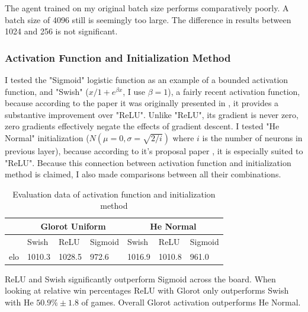 \noindent
The agent trained on my original batch size performs comparatively poorly. A batch size of 4096 still is seemingly too large. The difference in results between 1024 and 256 is not significant.


\subsubsection{Activation Function and Initialization Method}\label{subsubsec:tr:opt_alg:params:batch}
 I tested the "Sigmoid" logistic function as an example of a bounded activation function, and "Swish" ($x/1+e^{\beta x}$, I use $\beta = 1$),  a fairly recent activation function, because according to the paper it was originally presented in \cite{ramachandran2017searching}, it provides a substantive improvement over "ReLU". Unlike "ReLU", its gradient is never zero, zero gradients effectively negate the effects of gradient descent. I tested "He Normal" initialization ($N(\mu = 0, \sigma = \sqrt{2/i})$ where $i$ is the number of neurons in previous layer), because according to it's proposal paper \cite{He_2015_ICCV}, it is especially suited to "ReLU". Because this connection between activation function and initialization method is claimed, I also made comparisons between all their combinations.

\begin{table}[H]
\begin{center}
\begin{tabular}{ |l|p{1.25cm}|p{1.25cm}|p{1.25cm}||p{1.25cm}|p{1.25cm}|p{1.25cm}|  }
 \hline
 & \multicolumn{3}{c||}{Glorot Uniform} & \multicolumn{3}{c|}{He Normal}\\
 \hline
 \hline
  & Swish & ReLU & Sigmoid & Swish & ReLU & Sigmoid \\
 \hline
 elo & 1010.3 & 1028.5 & 972.6 & 1016.9 & 1010.8 & 961.0 \\
 \hline
\end{tabular}
\end{center}
\caption{Evaluation data of activation function and initialization method}
\label{tab:elo_activation_init}
\end{table}
\noindent
ReLU and Swish significantly outperform Sigmoid across the board. When looking at relative win percentages ReLU with Glorot only outperforms Swish with He $50.9\% \pm 1.8$ of games. Overall Glorot activation outperforms He Normal. 





